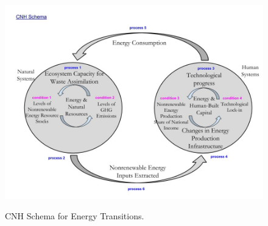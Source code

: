\documentclass[11pt,a4paper]{article}
\begin{document}
\begin{figure}
\centering\
\includegraphics[width=\linewidth]{CNH_Schema.jpg}
\caption[CNH Schema]{CNH Schema for Energy Transitions.}
\label{fig:CNH_Schema}
\end{figure}




\end{document}
